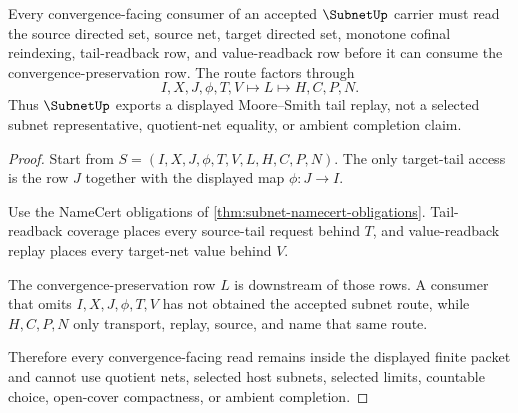 \begin{theorem}
\label{thm:subnet-convergence-route}
Every convergence-facing consumer of an accepted $\SubnetUp$ carrier must read the source directed set, source net, target directed set, monotone cofinal reindexing, tail-readback row, and value-readback row before it can consume the convergence-preservation row. The route factors through
$$
I,X,J,\phi,T,V \longmapsto L \longmapsto H,C,P,N .
$$
Thus $\SubnetUp$ exports a displayed Moore--Smith tail replay, not a selected subnet representative, quotient-net equality, or ambient completion claim.
\end{theorem}
\begin{proof}
Start from $S=(I,X,J,\phi,T,V,L,H,C,P,N)$. The only target-tail access is the row $J$ together with the displayed map $\phi:J\to I$.

Use the NameCert obligations of \autoref{thm:subnet-namecert-obligations}. Tail-readback coverage places every source-tail request behind $T$, and value-readback replay places every target-net value behind $V$.

The convergence-preservation row $L$ is downstream of those rows. A consumer that omits $I,X,J,\phi,T,V$ has not obtained the accepted subnet route, while $H,C,P,N$ only transport, replay, source, and name that same route.

Therefore every convergence-facing read remains inside the displayed finite packet and cannot use quotient nets, selected host subnets, selected limits, countable choice, open-cover compactness, or ambient completion.
\end{proof}



